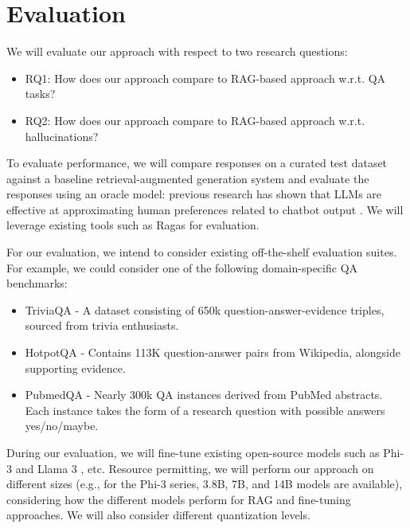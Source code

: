 \section{Evaluation}
We will evaluate our approach with respect to two research questions:

\begin{itemize}
\item RQ1: How does our approach compare to RAG-based approach w.r.t. QA tasks?
\item RQ2: How does our approach compare to RAG-based approach w.r.t. hallucinations?
\end{itemize}

To evaluate performance, we will compare responses on a curated test dataset
against a baseline retrieval-augmented generation system and evaluate the
responses using an oracle model: previous research has shown that LLMs are
effective at approximating human preferences related to chatbot output
\citep{zheng_judging_2023}. We will leverage existing tools such as Ragas
\citep{ragas} for evaluation.

For our evaluation, we intend to consider existing off-the-shelf evaluation
suites. For example, we could consider one of the following domain-specific QA
benchmarks:

\begin{itemize}
\item TriviaQA \citep{joshi_triviaqa_2017} - A dataset consisting of 650k question-answer-evidence triples, sourced from trivia enthusiasts.
\item HotpotQA \citep{yang_hotpotqa_2018} - Contains 113K question-answer pairs from Wikipedia, alongside supporting evidence.
\item PubmedQA \citep{jin_pubmedqa_2019} - Nearly 300k QA instances derived from PubMed abstracts. Each instance takes the form of a research question with possible answers yes/no/maybe.
\end{itemize}

During our evaluation, we will fine-tune existing open-source models such as
Phi-3 \citep{abdin_phi-3_2024} and Llama 3 \citep{dubey_llama_2024}, etc. Resource permitting,
we will perform our approach on different sizes (e.g., for the Phi-3 series, 3.8B,
7B, and 14B models are available), considering how the different models perform
for RAG and fine-tuning approaches. We will also consider different quantization
levels.
